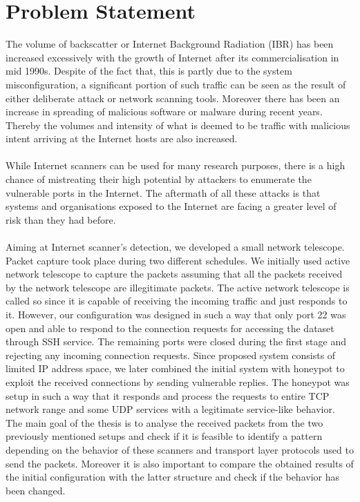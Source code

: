 	\section{Problem Statement}
	The volume of backscatter or Internet Background Radiation (IBR) \cite{pang2004characteristics}\cite{wustrow2010internet} has been increased excessively with the growth of Internet after its commercialisation in mid 1990s.
	Despite of the fact that, this is partly due to the system misconfiguration, a significant portion of such traffic can be seen as the result of either deliberate attack or network scanning tools.
	Moreover there has been an increase in spreading of malicious software or malware during recent years.
	Thereby the volumes and intensity of what is deemed to be traffic with malicious intent arriving at the Internet hosts are also increased.\\\\
	While Internet scanners can be used for many research purposes, there is a high chance of mistreating their high potential by attackers to enumerate the vulnerable ports in the Internet.
	The aftermath of all these attacks is that systems and organisations exposed to the Internet are facing a greater level of risk than they had before.\\\\
	Aiming at Internet scanner's detection, we developed a small network telescope. 
    Packet capture took place during two different schedules.
    We initially used active network telescope to capture the packets assuming that all the packets received by the network telescope are illegitimate packets.
    The active network telescope is called so since it is capable of receiving the incoming traffic and just responds to it.
    However, our configuration was designed in such a way that only port 22 was open and able to respond to the connection requests for accessing the dataset through SSH service.
    The remaining ports were closed during the first stage and rejecting any incoming connection requests.
	Since proposed system consists of limited IP address space, we later combined the initial system with honeypot to exploit the received connections by sending vulnerable replies.
	The honeypot was setup in such a way that it responds and process the requests to entire TCP network range and some UDP services with a legitimate service-like behavior.
	The main goal of the thesis is to analyse the received packets from the two previously mentioned setups and check if it is feasible to identify a pattern depending on the behavior of these scanners and transport layer protocols used to send the packets.
	Moreover it is also important to compare the obtained results of the initial configuration with the latter structure and check if the behavior has been changed.
	
    
	